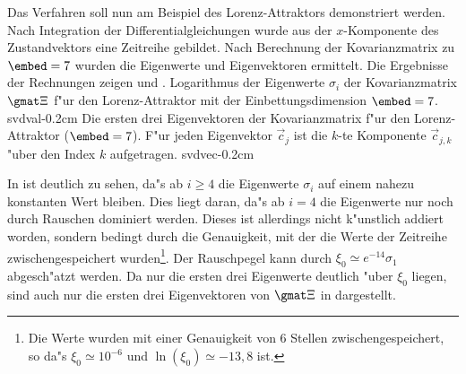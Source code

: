 Das Verfahren soll nun am Beispiel des Lorenz-Attraktors demonstriert werden.  Nach
Integration der Differentialgleichungen wurde aus der $x$-Komponente des Zustandvektors
eine Zeitreihe gebildet.  Nach Berechnung der Kovarianzmatrix zu $\embed=7$ wurden die
Eigenwerte und Eigenvektoren ermittelt.  Die Ergebnisse der Rechnungen zeigen
 und .
{Logarithmus der Eigenwerte $\sigma_i$ der Kovarianzmatrix $\gmat \Xi$ f"ur den
Lorenz-Attraktor mit der Einbettungsdimension $\embed=7$.
}
{svdval}{-0.2cm}
{Die ersten drei Eigenvektoren der Kovarianzmatrix f"ur den Lorenz-Attraktor
($\embed=7$). F"ur jeden Eigenvektor $\vec c_j$ ist die $k$-te Komponente
$\vec c_{j,k}$ "uber den Index $k$ aufgetragen.}
{svdvec}{-0.2cm}

In  ist deutlich zu sehen, da"s ab $i\geq 4$ die Eigenwerte $\sigma_i$ auf
einem nahezu konstanten Wert bleiben. Dies liegt daran, da"s ab $i=4$ die Eigenwerte nur
noch durch Rauschen dominiert werden. Dieses ist allerdings nicht k"unstlich addiert
worden, sondern bedingt durch die Genauigkeit, mit der die Werte der Zeitreihe
zwischengespeichert wurden\footnote{Die Werte wurden mit einer Genauigkeit von 6 Stellen
zwischengespeichert, so da"s $\xi_0\simeq 10^{-6}$ und $\ln(\xi_0)\simeq -13,8$ ist.}. 
Der Rauschpegel kann durch $\xi_0\simeq e^{-14}\sigma_1$ abgesch"atzt werden.
Da nur die ersten drei Eigenwerte deutlich "uber $\xi_0$ liegen, sind auch nur die
ersten drei Eigenvektoren von $\gmat\Xi$ in 
dargestellt. 

